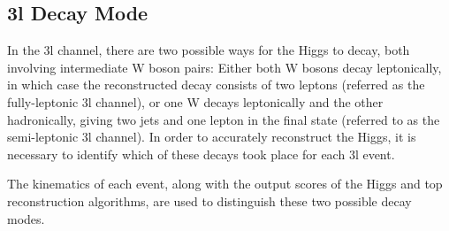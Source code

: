 \subsection{3l Decay Mode}
\label{sec:decay3l}

In the 3l channel, there are two possible ways for the Higgs to decay, both involving intermediate W boson pairs: Either both W bosons decay leptonically, in which case the reconstructed decay consists of two leptons (referred as the fully-leptonic 3l channel), or one W decays leptonically and the other hadronically, giving two jets and one lepton in the final state (referred to as the semi-leptonic 3l channel). In order to accurately reconstruct the Higgs, it is necessary to identify which of these decays took place for each 3l event.

The kinematics of each event, along with the output scores of the Higgs and top reconstruction algorithms, are used to distinguish these two possible decay modes.



